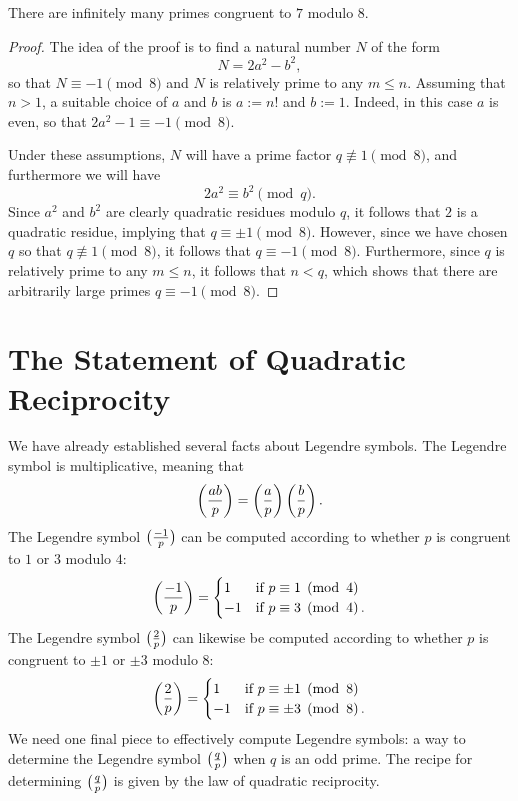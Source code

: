 \begin{theorem}
  There are infinitely many primes congruent to $7$ modulo $8$.
\end{theorem}

\begin{proof}
  The idea of the proof is to find a natural number $N$ of the form
  \begin{equation*}
    N=2a^2-b^2,
  \end{equation*}
  so that $N\equiv -1\pmod{8}$ and $N$ is relatively prime to any $m \leq n$. Assuming that $n>1$, a suitable choice of $a$ and $b$ is $a:=n!$ and $b:=1$. Indeed, in this case $a$ is even, so that $2a^2-1\equiv -1\pmod{8}$.

  Under these assumptions, $N$ will have a prime factor $q\nequiv 1\pmod{8}$, and furthermore we will have
  \begin{equation*}
    2a^2 \equiv b^2\pmod{q}.
  \end{equation*}
  Since $a^2$ and $b^2$ are clearly quadratic residues modulo $q$, it follows that $2$ is a quadratic residue, implying that $q\equiv\pm 1\pmod{8}$. However, since we have chosen $q$ so that $q\nequiv 1\pmod{8}$, it follows that $q\equiv -1\pmod{8}$. Furthermore, since $q$ is relatively prime to any $m \leq n$, it follows that $n<q$, which shows that there are arbitrarily large primes $q\equiv -1\pmod{8}$.
\end{proof}

\section{The Statement of Quadratic Reciprocity}

We have already established several facts about Legendre symbols. The Legendre symbol is multiplicative, meaning that
\begin{equation*}
  \legendre{ab}{p}=\legendre{a}{p}\legendre{b}{p}.
\end{equation*}
The Legendre symbol $\legendre{-1}{p}$ can be computed according to whether $p$ is congruent to $1$ or $3$ modulo $4$:
\begin{equation*}
  \legendre{-1}{p}=
  \begin{cases}
    1 & \text{if }p\equiv 1\pmod{4}\\
    -1 & \text{if }p\equiv 3\pmod{4}.
  \end{cases}
\end{equation*}
The Legendre symbol $\legendre{2}{p}$ can likewise be computed according to whether $p$ is congruent to $\pm 1$ or $\pm 3$ modulo $8$:
\begin{equation*}
  \legendre{2}{p}=
  \begin{cases}
    1 & \text{if }p\equiv \pm1\pmod{8}\\
    -1 & \text{if }p\equiv \pm3\pmod{8}.
  \end{cases}
\end{equation*}
We need one final piece to effectively compute Legendre symbols: a way to determine the Legendre symbol $\legendre{q}{p}$ when $q$ is an odd prime. The recipe for determining $\legendre{q}{p}$ is given by the law of quadratic reciprocity.

